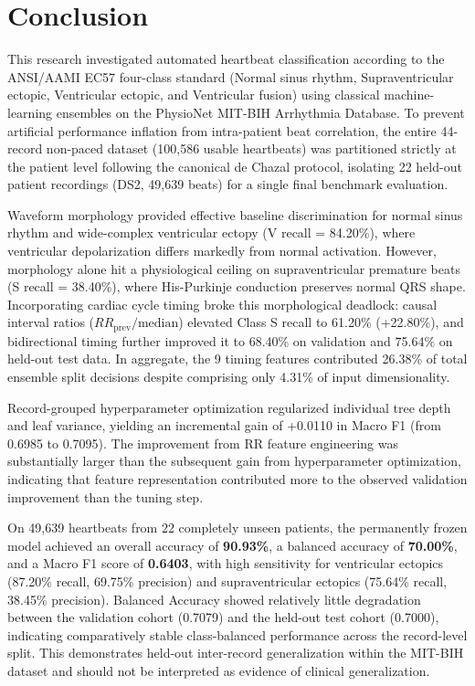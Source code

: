 \documentclass[conference]{IEEEtran}
\begin{document}
\section{Conclusion}
This research investigated automated heartbeat classification according to the ANSI/AAMI EC57 four-class standard (Normal sinus rhythm, Supraventricular ectopic, Ventricular ectopic, and Ventricular fusion) using classical machine-learning ensembles on the PhysioNet MIT-BIH Arrhythmia Database. To prevent artificial performance inflation from intra-patient beat correlation, the entire 44-record non-paced dataset (100,586 usable heartbeats) was partitioned strictly at the patient level following the canonical de Chazal protocol, isolating 22 held-out patient recordings (DS2, 49,639 beats) for a single final benchmark evaluation.

Waveform morphology provided effective baseline discrimination for normal sinus rhythm and wide-complex ventricular ectopy (V recall = 84.20\%), where ventricular depolarization differs markedly from normal activation. However, morphology alone hit a physiological ceiling on supraventricular premature beats (S recall = 38.40\%), where His-Purkinje conduction preserves normal QRS shape. Incorporating cardiac cycle timing broke this morphological deadlock: causal interval ratios ($RR_{\text{prev}} / \text{median}$) elevated Class S recall to 61.20\% (+22.80\%), and bidirectional timing further improved it to 68.40\% on validation and 75.64\% on held-out test data. In aggregate, the 9 timing features contributed 26.38\% of total ensemble split decisions despite comprising only 4.31\% of input dimensionality.

Record-grouped hyperparameter optimization regularized individual tree depth and leaf variance, yielding an incremental gain of +0.0110 in Macro F1 (from 0.6985 to 0.7095). The improvement from RR feature engineering was substantially larger than the subsequent gain from hyperparameter optimization, indicating that feature representation contributed more to the observed validation improvement than the tuning step.

On 49,639 heartbeats from 22 completely unseen patients, the permanently frozen model achieved an overall accuracy of \textbf{90.93\%}, a balanced accuracy of \textbf{70.00\%}, and a Macro F1 score of \textbf{0.6403}, with high sensitivity for ventricular ectopics (87.20\% recall, 69.75\% precision) and supraventricular ectopics (75.64\% recall, 38.45\% precision). Balanced Accuracy showed relatively little degradation between the validation cohort (0.7079) and the held-out test cohort (0.7000), indicating comparatively stable class-balanced performance across the record-level split. This demonstrates held-out inter-record generalization within the MIT-BIH dataset and should not be interpreted as evidence of clinical generalization.
\end{document}

